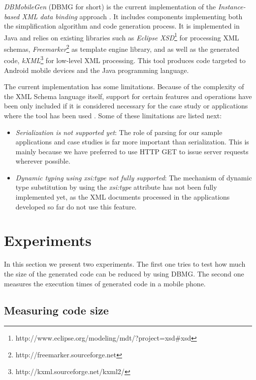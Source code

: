 \documentclass{sig-alternate}
\begin{document}
\textit{DBMobileGen} (DBMG for short) is the current implementation of the \textit{Instance-based XML data binding} approach \cite{thesis:tamayo}. It includes components implementing both the simplification algorithm and code generation process. It is implemented in Java and relies on existing libraries such as \textit{Eclipse XSD}\footnote{http://www.eclipse.org/modeling/mdt/?project=xsd\#xsd} for processing XML schemas, \textit{Freemarker}\footnote{http://freemarker.sourceforge.net} as template engine library, and as well as the generated code, \textit{kXML}\footnote{http://kxml.sourceforge.net/kxml2/} for low-level XML processing. This tool produces code targeted to Android mobile devices and the Java programming language.

The current implementation has some limitations. Because of the complexity of the XML Schema language itself, support for certain features and operations have been only included if it is considered necessary for the case study or applications where the tool has been used \cite{pre:arago, proc:tamayo5}. Some of these limitations are  listed next:

\begin{itemize}
\item \textit{Serialization is not supported yet}: The role of parsing for our sample applications and case studies is far more important than serialization. This is mainly because we have preferred to use HTTP GET to issue server requests wherever possible. 
\item  \textit{Dynamic typing using xsi:type not fully supported}: The mechanism of dynamic type substitution by using the \textit{xsi:type} attribute has not been fully implemented yet, as the XML documents processed in the applications developed so far do not use this feature. 
\end{itemize} 


\section{Experiments}

In this section we present two experiments. The first one tries to test how much the size of the generated code can be reduced by using DBMG. The second one measures the execution times of generated code in a mobile phone.

\subsection{Measuring code size}
\end{document}
